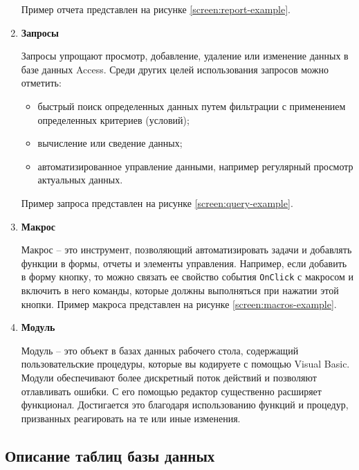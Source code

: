 \begin{enumerate}
    \tab Пример отчета представлен на рисунке \ref{screen:report-example}.
    

    \item \textbf{Запросы}
    
    \tab Запросы упрощают просмотр, добавление, удаление или изменение данных в базе данных Access. Среди других целей использования запросов можно отметить:
    \begin{itemize}
        \item быстрый поиск определенных данных путем фильтрации с применением определенных критериев (условий);
        \item вычисление или сведение данных;
        \item автоматизированное управление данными, например регулярный просмотр актуальных данных.
    \end{itemize}
    
    \tab Пример запроса представлен на рисунке \ref{screen:query-example}.


    \item \textbf{Макрос}
    
    \tab Макрос -- это инструмент, позволяющий автоматизировать задачи и добавлять функции в формы, отчеты и элементы управления. Например, если добавить в форму кнопку, то можно связать ее свойство события \texttt{OnClick} с макросом и включить в него команды, которые должны выполняться при нажатии этой кнопки. Пример макроса представлен на рисунке \ref{screen:macros-example}.


    \item \textbf{Модуль}
    
    \tab Модуль -- это объект в базах данных рабочего стола, содержащий пользовательские процедуры, которые вы кодируете с помощью Visual Basic. Модули обеспечивают более дискретный поток действий и позволяют отлавливать ошибки. С его помощью редактор существенно расширяет функционал. Достигается это благодаря использованию функций и процедур, призванных реагировать на те или иные изменения.
\end{enumerate}


\subsection{Описание таблиц базы данных}


\newcommand{\limg}[2]{
    \begin{figure}[H]
        \center{\texttt{[image: screenshots/\#1]}}
        \caption{#2}
        \label{screen:#1}
    \end{figure}
}
\newcommand{\llimg}[2]{
    \begin{figure}[H]
        \center{\texttt{[image: screenshots/\#1]}}
        \caption{#2}
        \label{screen:#1}
    \end{figure}
}


